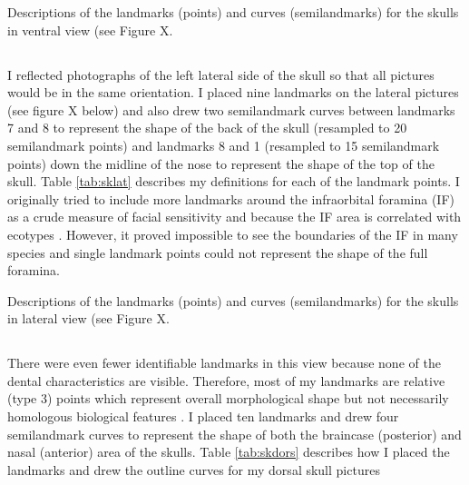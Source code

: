 \begin{table}[h]
\caption[Skulls: ventral landmarks]
		{Descriptions of the landmarks (points) and curves (semilandmarks) for the skulls in ventral view (see Figure X.} 

\label{tab:skvent}
\end{table}
\subsection{}
I reflected photographs of the left lateral side of the skull so that all pictures would be in the same orientation. I placed nine landmarks on the lateral pictures (see figure X below) and also drew two semilandmark curves between landmarks 7 and 8 to represent the shape of the back of the skull (resampled to 20 semilandmark points) and landmarks 8 and 1 (resampled to 15 semilandmark points) down the midline of the nose to represent the shape of the top of the skull. Table \ref{tab:sklat} describes my definitions for each of the landmark points.
I originally tried to include more landmarks around the infraorbital foramina (IF) as a crude measure of facial sensitivity and because the IF area is correlated with ecotypes \citep{Crumpton2012}. However, it proved impossible to see the boundaries of the IF in many species and single landmark points could not represent the shape of the full foramina. 

\begin{table}[h]
\caption[Skulls: lateral landmarks]
		{Descriptions of the landmarks (points) and curves (semilandmarks) for the skulls in lateral view (see Figure X.} 

\label{tab:sklat}
\end{table}

\subsection{}
There were even fewer identifiable landmarks in this view because none of the dental characteristics are visible. Therefore, most of my landmarks are relative (type 3) points which represent overall morphological shape but not necessarily homologous biological features \citep{Zelditch2012}. I placed ten landmarks and drew four semilandmark curves to represent the shape of both the braincase (posterior) and nasal (anterior) area of the skulls. Table \ref{tab:skdors} describes how I placed the landmarks and drew the outline curves for my dorsal skull pictures 

